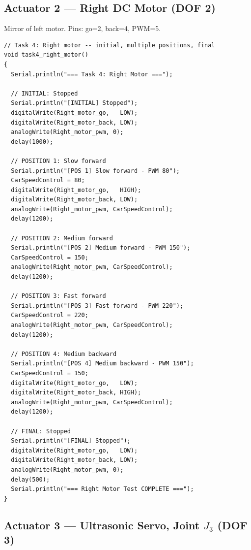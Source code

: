 \documentclass[12pt,a4paper]{article}
\begin{document}
\subsection{Actuator 2 --- Right DC Motor (DOF 2)}

\begin{donebox}{}
Mirror of left motor. Pins: go=2, back=4, PWM=5.
\end{donebox}

\begin{lstlisting}[style=arduino,caption={Task 4 --- Right motor position/state test}]
// Task 4: Right motor -- initial, multiple positions, final
void task4_right_motor()
{
  Serial.println("=== Task 4: Right Motor ===");

  // INITIAL: Stopped
  Serial.println("[INITIAL] Stopped");
  digitalWrite(Right_motor_go,   LOW);
  digitalWrite(Right_motor_back, LOW);
  analogWrite(Right_motor_pwm, 0);
  delay(1000);

  // POSITION 1: Slow forward
  Serial.println("[POS 1] Slow forward - PWM 80");
  CarSpeedControl = 80;
  digitalWrite(Right_motor_go,   HIGH);
  digitalWrite(Right_motor_back, LOW);
  analogWrite(Right_motor_pwm, CarSpeedControl);
  delay(1200);

  // POSITION 2: Medium forward
  Serial.println("[POS 2] Medium forward - PWM 150");
  CarSpeedControl = 150;
  analogWrite(Right_motor_pwm, CarSpeedControl);
  delay(1200);

  // POSITION 3: Fast forward
  Serial.println("[POS 3] Fast forward - PWM 220");
  CarSpeedControl = 220;
  analogWrite(Right_motor_pwm, CarSpeedControl);
  delay(1200);

  // POSITION 4: Medium backward
  Serial.println("[POS 4] Medium backward - PWM 150");
  CarSpeedControl = 150;
  digitalWrite(Right_motor_go,   LOW);
  digitalWrite(Right_motor_back, HIGH);
  analogWrite(Right_motor_pwm, CarSpeedControl);
  delay(1200);

  // FINAL: Stopped
  Serial.println("[FINAL] Stopped");
  digitalWrite(Right_motor_go,   LOW);
  digitalWrite(Right_motor_back, LOW);
  analogWrite(Right_motor_pwm, 0);
  delay(500);
  Serial.println("=== Right Motor Test COMPLETE ===");
}
\end{lstlisting}

\subsection{Actuator 3 --- Ultrasonic Servo, Joint $J_3$ (DOF 3)}
\end{document}
